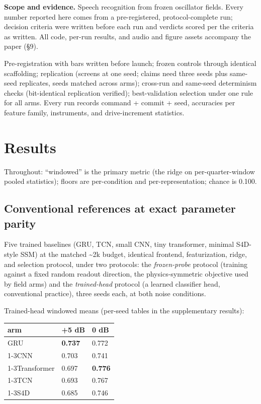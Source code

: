 \documentclass{article}
\makeatletter
\newcounter{none} %
\newcommand{\iclr@floatbarrier}{\par\vspace{\z@}%
  \ifx\@deferlist\@empty\else\clearpage\fi}
\let\iclr@section\section
\renewcommand{\section}{\iclr@floatbarrier\iclr@section}
\makeatother
\begin{document}
\textbf{Scope and evidence.} Speech recognition from frozen oscillator
fields. Every number reported here comes from a pre-registered,
protocol-complete run; decision criteria were written before each run
and verdicts scored per the criteria as written. All code, per-run
results, and audio and figure assets accompany the paper (§9).

Pre-registration with bars written before launch; frozen controls
through identical scaffolding; replication (screens at one seed; claims
need three seeds plus same-seed replicates, seeds matched across arms);
cross-run and same-seed determinism checks (bit-identical replication
verified); best-validation selection under one rule for all arms. Every
run records command + commit + seed, accuracies per feature family,
instruments, and drive-increment statistics.

\section{Results}\label{results}

Throughout: ``windowed'' is the primary metric (the ridge on
per-quarter-window pooled statistics); floors are per-condition and
per-representation; chance is 0.100.

\subsection{Conventional references at exact parameter
parity}\label{conventional-references-at-exact-parameter-parity}

Five trained baselines (GRU, TCN, small CNN, tiny transformer, minimal
S4D-style SSM) at the matched \textasciitilde2k budget, identical
frontend, featurization, ridge, and selection protocol, under two
protocols: the \emph{frozen-probe} protocol (training against a fixed
random readout direction, the physics-symmetric objective used by field
arms) and the \emph{trained-head} protocol (a learned classifier head,
conventional practice), three seeds each, at both noise conditions.

Trained-head windowed means (per-seed tables in the supplementary
results):

{\def\LTcaptype{none} %
\begin{longtable}[]{@{}lll@{}}
\toprule\noalign{}
arm & +5 dB & 0 dB \\
\midrule\noalign{}
\endhead
\bottomrule\noalign{}
\endlastfoot
GRU & \textbf{0.737} & 0.772 \\
\cmidrule{1-3}CNN & 0.703 & 0.741 \\
\cmidrule{1-3}Transformer & 0.697 & \textbf{0.776} \\
\cmidrule{1-3}TCN & 0.693 & 0.767 \\
\cmidrule{1-3}S4D & 0.685 & 0.746 \\
\end{longtable}
}
\end{document}
